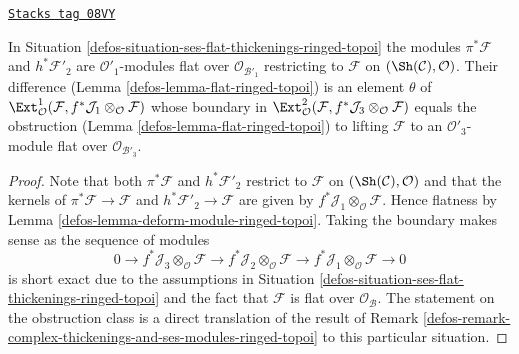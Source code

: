 \begin{lemma}
\label{defos-lemma-verify-iv-ringed-topoi}
\href{https://stacks.math.columbia.edu/tag/08VY}{\texttt{Stacks tag 08VY}}

In Situation \ref{defos-situation-ses-flat-thickenings-ringed-topoi} the modules
$\pi^*\mathcal{F}$ and $h^*\mathcal{F}'_2$ are $\mathcal{O}'_1$-modules
flat over $\mathcal{O}_{\mathcal{B}'_1}$ restricting to $\mathcal{F}$ on
$(\Sh(\mathcal{C}), \mathcal{O})$.
Their difference (Lemma \ref{defos-lemma-flat-ringed-topoi}) is an element
$\theta$ of
$\Ext^1_\mathcal{O}(\mathcal{F},
f^*\mathcal{J}_1 \otimes_\mathcal{O} \mathcal{F})$
whose boundary in
$\Ext^2_\mathcal{O}(\mathcal{F},
f^*\mathcal{J}_3 \otimes_\mathcal{O} \mathcal{F})$
equals the obstruction (Lemma \ref{defos-lemma-flat-ringed-topoi})
to lifting $\mathcal{F}$ to an $\mathcal{O}'_3$-module flat over
$\mathcal{O}_{\mathcal{B}'_3}$.
\end{lemma}

\begin{proof}

Note that both $\pi^*\mathcal{F}$ and $h^*\mathcal{F}'_2$
restrict to $\mathcal{F}$ on $(\Sh(\mathcal{C}), \mathcal{O})$
and that the kernels of
$\pi^*\mathcal{F} \to \mathcal{F}$ and $h^*\mathcal{F}'_2 \to \mathcal{F}$
are given by $f^*\mathcal{J}_1 \otimes_\mathcal{O} \mathcal{F}$.
Hence flatness by Lemma \ref{defos-lemma-deform-module-ringed-topoi}.
Taking the boundary makes sense as the sequence of modules
$$
0 \to f^*\mathcal{J}_3 \otimes_\mathcal{O} \mathcal{F} \to
f^*\mathcal{J}_2 \otimes_\mathcal{O} \mathcal{F} \to
f^*\mathcal{J}_1 \otimes_\mathcal{O} \mathcal{F} \to 0
$$
is short exact due to the assumptions in
Situation \ref{defos-situation-ses-flat-thickenings-ringed-topoi}
and the fact that $\mathcal{F}$ is flat over $\mathcal{O}_\mathcal{B}$.
The statement on the obstruction class is a direct translation
of the result of
Remark \ref{defos-remark-complex-thickenings-and-ses-modules-ringed-topoi}
to this particular situation.
\end{proof}

